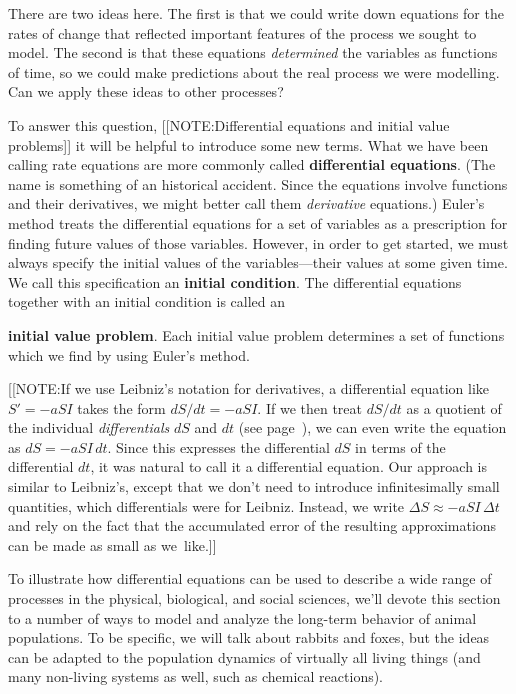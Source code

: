 There are two ideas here.  The first is that we could write down
equations for the rates of change that reflected important features of
the process we sought to model.  The second is that these equations
{\em determined\/} the variables as functions of time, so we could
make predictions about the real process we were modelling.  Can we
apply these ideas to other processes?

To answer this question, 
[[NOTE:Differential equations and initial value problems]]
it will be helpful to introduce some new terms.  What we have been
calling rate equations are more commonly called {\bf differential
  equations}.  (The name is something of an historical accident.
Since the equations involve functions and their derivatives, we might
better call them {\em derivative\/} equations.)  Euler's method treats
the differential equations for a set of variables as a prescription
for finding future values of those variables.  However, in order to
get started, we must always specify the initial values of the
variables---their values at some given time.  We call this
specification an {\bf initial condition}. The
differential equations together with an initial condition is called an

{\bf initial value problem}. Each initial
value problem determines a set of functions which we find by using
Euler's method.

[[NOTE:If we use Leibniz's notation for derivatives, a differential
  equation like $S' = -aSI$ takes the form $dS/dt = -aSI$.  If we then
  treat $dS/dt$ as a quotient of the individual {\em
    differentials\/} $dS$ and $dt$ (see
  page~\pageref{differential}), we can even write the equation as $dS
  = -aSI\,dt$.  Since this expresses the differential $dS$ in terms of
  the differential $dt$, it was natural to call it a differential
  equation.  Our approach is similar to Leibniz's, except that we
  don't need to introduce infinitesimally small quantities, which
  differentials were for Leibniz.  Instead, we write $\Delta S \approx
  -aSI\,\Delta t$ and rely on the fact that the accumulated error of
  the resulting approximations can be made as small as we~like.]]

To illustrate how differential equations can be used to describe a
wide range of processes in the physical, biological, and social
sciences, we'll devote this section to a number of ways to model and
analyze the long-term behavior of animal populations.  To be specific,
we will talk about rabbits and foxes, but the ideas can be adapted to
the population dynamics of virtually all living things (and many
non-living systems as well, such as chemical reactions).

